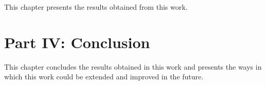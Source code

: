  \vspace{1mm}
\noindent This chapter presents the results obtained from this work.\\

\section*{Part IV: Conclusion}
  \vspace{1mm}
\noindent This chapter concludes the results obtained in this work and presents the ways in which this work could be extended and improved in the future.\\
